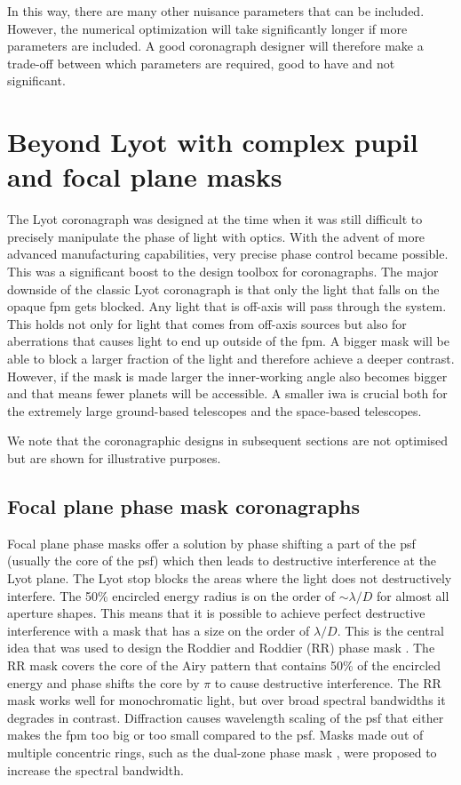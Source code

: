 \documentclass[letterpaper]{ar-1col}
\newcommand{\ld}{$\lambda/D$}
\begin{document}
In this way, there are many other nuisance parameters that can be included.
%
However, the numerical optimization will take significantly longer if more parameters are included.
%
A good coronagraph designer will therefore make a trade-off between which parameters are required, good to have and not significant.

\section{Beyond Lyot with complex pupil and focal plane masks}


The Lyot coronagraph was designed at the time when it was still difficult to precisely manipulate the phase of light with optics.
%
With the advent of more advanced manufacturing capabilities, very precise phase control became possible.
%
This was a significant boost to the design toolbox for coronagraphs.
%
The major downside of the classic Lyot coronagraph is that only the light that falls on the opaque \ac{fpm} gets blocked.
%
Any light that is off-axis will pass through the system.
%
This holds not only for light that comes from off-axis sources but also for aberrations that causes light to end up outside of the \ac{fpm}.
%
A bigger mask will be able to block a larger fraction of the light and therefore achieve a deeper contrast.
%
However, if the mask is made larger the inner-working angle also becomes bigger and that means fewer planets will be accessible.
%
A smaller \ac{iwa} is crucial both for the extremely large ground-based telescopes and the space-based telescopes. 

We note that the coronagraphic designs in subsequent sections are not optimised but are shown for illustrative purposes.

\subsection{Focal plane phase mask coronagraphs}

Focal plane phase masks offer a solution by phase shifting a part of the \ac{psf} (usually the core of the \ac{psf}) which then leads to destructive interference at the Lyot plane.
%
The Lyot stop blocks the areas where the light does not destructively interfere.
%
The 50\% encircled energy radius is on the order of $\sim$\ld{} for almost all aperture shapes.
%
This means that it is possible to achieve perfect destructive interference with a mask that has a size on the order of \ld{}.
%
This is the central idea that was used to design the Roddier and Roddier (RR) phase mask \citep{roddier1997stellar}.
%
The RR mask covers the core of the Airy pattern that contains 50\% of the encircled energy and phase shifts the core by $\pi$ to cause destructive interference.
%
The RR mask works well for monochromatic light, but over broad spectral bandwidths it degrades in contrast.
%
Diffraction causes wavelength scaling of the \ac{psf} that either makes the \ac{fpm} too big or too small compared to the \ac{psf}.
%
Masks made out of multiple concentric rings, such as the dual-zone phase mask \citep{soummer2003achromatic}, were proposed to increase the spectral bandwidth.
\end{document}
